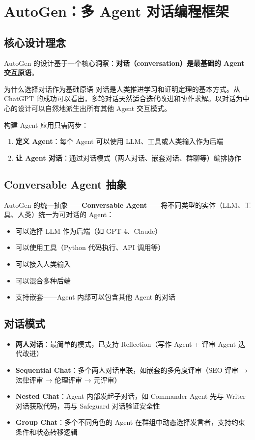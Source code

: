 \section{AutoGen：多 Agent 对话编程框架}

\subsection{核心设计理念}

AutoGen 的设计基于一个核心洞察：\textbf{对话（conversation）是最基础的 Agent 交互原语}。

\begin{knowledgebox}{为什么选择对话作为基础原语}
对话是人类推进学习和证明定理的基本方式。从 ChatGPT 的成功可以看出，多轮对话天然适合迭代改进和协作求解。以对话为中心的设计可以自然地派生出所有其他 Agent 交互模式。
\end{knowledgebox}

构建 Agent 应用只需两步：
\begin{enumerate}
    \item \textbf{定义 Agent}：每个 Agent 可以使用 LLM、工具或人类输入作为后端
    \item \textbf{让 Agent 对话}：通过对话模式（两人对话、嵌套对话、群聊等）编排协作
\end{enumerate}

\subsection{Conversable Agent 抽象}

AutoGen 的统一抽象——\textbf{Conversable Agent}——将不同类型的实体（LLM、工具、人类）统一为可对话的 Agent：
\begin{itemize}
    \item 可以选择 LLM 作为后端（如 GPT-4、Claude）
    \item 可以使用工具（Python 代码执行、API 调用等）
    \item 可以接入人类输入
    \item 可以混合多种后端
    \item 支持嵌套——Agent 内部可以包含其他 Agent 的对话
\end{itemize}

\subsection{对话模式}

\begin{itemize}
    \item \textbf{两人对话}：最简单的模式，已支持 Reflection（写作 Agent + 评审 Agent 迭代改进）
    \item \textbf{Sequential Chat}：多个两人对话串联，如嵌套的多角度评审（SEO 评审 → 法律评审 → 伦理评审 → 元评审）
    \item \textbf{Nested Chat}：Agent 内部发起子对话，如 Commander Agent 先与 Writer 对话获取代码，再与 Safeguard 对话验证安全性
    \item \textbf{Group Chat}：多个不同角色的 Agent 在群组中动态选择发言者，支持约束条件和状态转移逻辑
\end{itemize}

